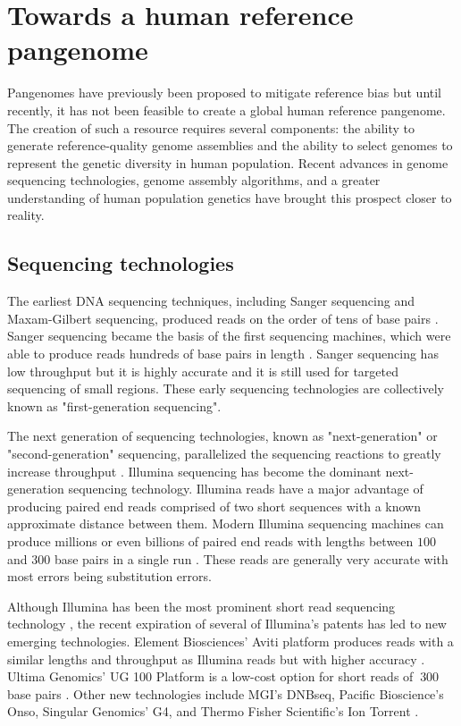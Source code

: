 \documentclass[11pt]{ucscthesis}
\begin{document}
\section{Towards a human reference pangenome}

Pangenomes have previously been proposed to mitigate reference bias \cite{li_building_2010} but until recently, it has not been feasible to create a global human reference pangenome.
The creation of such a resource requires several components: the ability to generate reference-quality genome assemblies and the ability to select genomes to represent the genetic diversity in human population.
Recent advances in genome sequencing technologies, genome assembly algorithms, and a greater understanding of human population genetics have brought this prospect closer to reality.

\subsection{Sequencing technologies}
\label{sec:background:sequencing}

The earliest DNA sequencing techniques, including Sanger sequencing and Maxam-Gilbert sequencing, produced reads on the order of tens of base pairs \cite{sanger_sequencing_1975,sanger_sequencing_1977,maxam_sequencing_1980}.
Sanger sequencing became the basis of the first sequencing machines, which were able to produce reads hundreds of base pairs in length \cite{sequencing_review_2016}.
Sanger sequencing has low throughput but it is highly accurate and it is still used for targeted sequencing of small regions.
These early sequencing technologies are collectively known as "first-generation sequencing".

The next generation of sequencing technologies, known as "next-generation" or "second-generation" sequencing, parallelized the sequencing reactions to greatly increase throughput \cite{sequencing_review_2016}. 
Illumina sequencing has become the dominant next-generation sequencing technology.
Illumina reads have a major advantage of producing paired end reads comprised of two short sequences with a known approximate distance between them.
Modern Illumina sequencing machines can produce millions or even billions of paired end reads with lengths between $100$ and $300$ base pairs in a single run \cite{illumina_sequencing_nodate}.
These reads are generally very accurate with most errors being substitution errors.

Although Illumina has been the most prominent short read sequencing technology \cite{sr_review_2025}, the recent expiration of several of Illumina's patents has led to new emerging technologies.
Element Biosciences' Aviti platform produces reads with a similar lengths and throughput as Illumina reads but with higher accuracy \cite{element_sequencing_2024}. 
Ultima Genomics' UG 100 Platform is a low-cost option for short reads of $~300$ base pairs \cite{ultima_sequencing_2022}. 
Other new technologies include MGI's DNBseq, Pacific Bioscience's Onso, Singular Genomics' G4, and Thermo Fisher Scientific's Ion Torrent \cite{sr_review_2025}.
\end{document}
